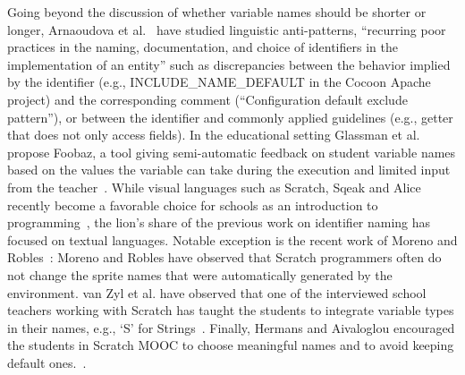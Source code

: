 \documentclass[conference]{IEEEtran}
\begin{document}
%

Going beyond the discussion of whether variable names should be shorter or longer, Arnaoudova et al.~\cite{ArnaoudovaPAG13,ArnaoudovaPA16} have studied linguistic anti-patterns, ``recurring poor practices in the naming, documentation, and choice of identifiers in the implementation of an entity'' such as discrepancies between the behavior implied by the identifier (e.g., {\sc INCLUDE\_NAME\_DEFAULT} in the Cocoon Apache project) and the corresponding comment (``Configuration default exclude pattern''), or between the identifier and commonly applied guidelines (e.g., getter that does not only access fields). 
In the educational setting Glassman et al. propose Foobaz, a tool giving semi-automatic feedback on student variable names based on the values the variable can take during the execution and limited input from the teacher~\cite{Glassman}.
While visual languages such as Scratch, Sqeak and Alice recently become a favorable choice for schools as an introduction to programming~\cite{Matsuzawa}, the lion's share of the previous work on identifier naming has focused on textual languages.
Notable exception is the recent work of Moreno and Robles~\cite{MoreonoRobles}: Moreno and Robles have observed that Scratch programmers often do not change the sprite names that were automatically generated by the environment. 
van Zyl et al. have observed that one of the interviewed school teachers working with Scratch has taught the students to integrate variable types in their names, e.g., `S' for Strings~\cite{vanZyl}. Finally, Hermans and Aivaloglou encouraged the students in Scratch MOOC to choose meaningful names and to avoid keeping default ones.~\cite{hermans_aivaloglou}. 
\end{document}
